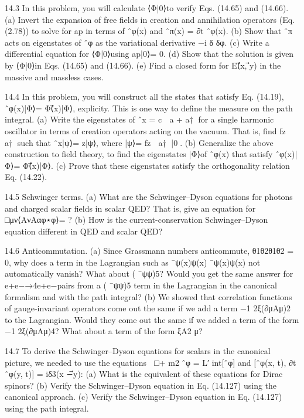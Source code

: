 14.3 In this problem, you will calculate ⟨Φ|0⟩to verify Eqs. (14.65) and (14.66).
(a) Invert the expansion of free ﬁelds in creation and annihilation operators
(Eq. (2.78)) to solve for ap in terms of ˆφ(x) and ˆπ(x) = ∂t ˆφ(x).
(b) Show that ˆπ acts on eigenstates of ˆφ as the variational derivative −i δ
δφ.
(c) Write a differential equation for ⟨Φ|0⟩using ap|0⟩= 0.
(d) Show that the solution is given by ⟨Φ|0⟩in Eqs. (14.65) and (14.66).
(e) Find a closed form for E(⃗x, ⃗y) in the massive and massless cases.

14.4 In this problem, you will construct all the states that satisfy Eq. (14.19), ˆφ(⃗x)|Φ⟩=
Φ(⃗x)|Φ⟩, explicity. This is one way to deﬁne the measure on the path integral.
(a) Write the eigenstates of ˆx = c

a + a†
for a single harmonic oscillator in terms
of creation operators acting on the vacuum. That is, ﬁnd fz

a†
such that ˆx|ψ⟩=
z|ψ⟩, where |ψ⟩= fz

a†
|0⟩.
(b) Generalize the above construction to ﬁeld theory, to ﬁnd the eigenstates |Φ⟩of
ˆφ(⃗x) that satisfy ˆφ(⃗x)|Φ⟩= Φ(⃗x)|Φ⟩.
(c) Prove that these eigenstates satisfy the orthogonality relation Eq. (14.22).

14.5 Schwinger terms.
(a) What are the Schwinger–Dyson equations for photons and charged scalar ﬁelds
in scalar QED? That is, give an equation for □μν⟨AνAαφ⋆φ⟩= ?
(b) How is the current-conservation Schwinger–Dyson equation different in QED
and scalar QED?

14.6 Anticommutation.
(a) Since Grassmann numbers anticommute, θ1θ2θ1θ2 = 0, why does a term in the
Lagrangian such as ¯ψ(x)ψ(x) ¯ψ(x)ψ(x) not automatically vanish? What about
( ¯ψψ)5? Would you get the same answer for e+e−→4e+e−pairs from a ( ¯ψψ)5
term in the Lagrangian in the canonical formalism and with the path integral?
(b) We showed that correlation functions of gauge-invariant operators come out the
same if we add a term −1
2ξ(∂μAμ)2 to the Lagrangian. Would they come out
the same if we added a term of the form −1
2ξ(∂μAμ)4? What about a term of the
form ξA2
μ?

14.7 To derive the Schwinger–Dyson equations for scalars in the canonical picture,
we needed to use the equations

□+ m2ˆφ = L′
int[ˆφ] and [ˆφ(⃗x, t), ∂t ˆφ(⃗y, t)] =
iδ3(⃗x −⃗y):
(a) What is the equivalent of these equations for Dirac spinors?
(b) Verify the Schwinger–Dyson equation in Eq. (14.127) using the canonical
approach.
(c) Verify the Schwinger–Dyson equation in Eq. (14.127) using the path integral.

